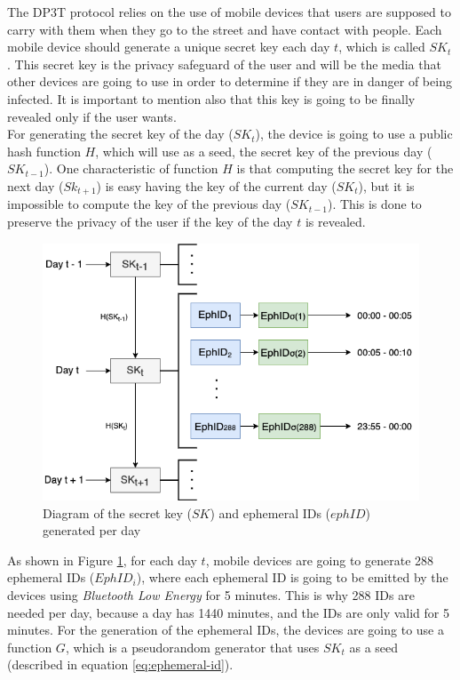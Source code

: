 \documentclass[a4paper, 12pt]{article}
\begin{document}
The DP3T protocol relies on the use of mobile devices that users are supposed to carry with them when they go to the street and have contact with people. Each mobile device should generate a unique secret key each day $t$, which is called $SK_t$. This secret key is the privacy safeguard of the user and will be the media that other devices are going to use in order to determine if they are in danger of being infected. It is important to mention also that this key is going to be finally revealed only if the user wants. \\

For generating the secret key of the day ($SK_t$), the device is going to use a public hash function $H$, which will use as a seed, the secret key of the previous day ($SK_{t-1}$). One characteristic of function $H$ is that computing the secret key for the next day ($Sk_{t+1}$) is easy having the key of the current day ($SK_t$), but it is impossible to compute the key of the previous day ($SK_{t-1}$). This is done to preserve the privacy of the user if the key of the day $t$ is revealed.

\begin{figure}[h]
    \centering
    \includegraphics[scale=0.4]{images/discussion/SK-ids-diagram.png}
    \caption{Diagram of the secret key ($SK$) and ephemeral IDs ($ephID$) generated per day}
    \label{fig:sk-diagram}
\end{figure}

As shown in Figure \ref{fig:sk-diagram}, for each day $t$, mobile devices are going to generate 288 ephemeral IDs ($EphID_i$), where each ephemeral ID is going to be emitted by the devices using \textit{Bluetooth Low Energy} for 5 minutes. This is why 288 IDs are needed per day, because a day has 1440 minutes, and the IDs are only valid for 5 minutes. For the generation of the ephemeral IDs, the devices are going to use a function $G$, which is a pseudorandom generator that uses $SK_t$ as a seed (described in equation \ref{eq:ephemeral-id}).
\end{document}
